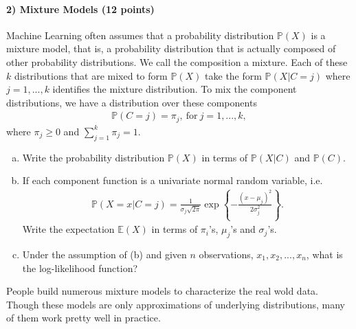 \documentclass[11pt]{article}
\begin{document}
\paragraph{2) Mixture Models (12 points)}

Machine Learning often assumes that a probability distribution $\mathbb{P}(X)$ is a mixture model, that is, a probability distribution that is actually composed of other probability distributions. We call the composition a mixture. Each of these $k$ distributions that are mixed to form $\mathbb{P}(X)$ take the form
$\mathbb{P}(X|C=j)$ where  $j = 1,...,k$ identifies the mixture distribution.  To mix the component distributions, we have a distribution over these components
\begin{align}
\mathbb{P}(C=j) = \pi_j,~\textrm{for}~j=1,...,k,
\end{align}
where $\pi_j \geq 0$ and $\sum_{j=1}^k\pi_j=1$.

\begin{enumerate}[(a)]
\item Write the probability distribution $\mathbb{P}(X)$ in terms of $\mathbb{P}(X|C)$ and $\mathbb{P}(C)$.
\item If each component function is a univariate normal random variable, i.e.
\begin{align}
\mathbb{P}(X=x|C=j) = \frac{1}{\sigma_j\sqrt{2\pi}}\exp\left\{{-\frac{(x-\mu_j)^2}{2\sigma_j^2}}\right\}.
\end{align}
Write the expectation $\mathbb{E}(X)$ in terms of $\pi_i$'s, $\mu_j$'s and $\sigma_j$'s.
\item Under the assumption of (b) and given $n$ observations, $x_1,x_2,...,x_n$, what is the log-likelihood function?
\end{enumerate}
People build numerous mixture models to characterize the real wold data. Though these models are only approximations of underlying distributions, many of them work pretty well in practice.

\begin{center}
\end{center}
\end{document}
